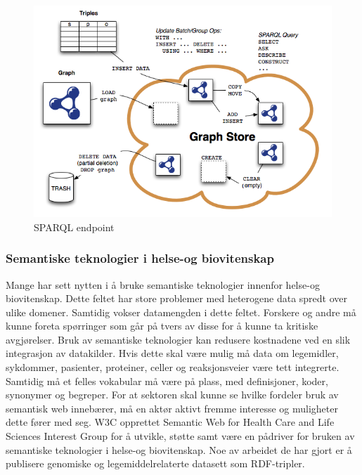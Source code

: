 \begin{figure}[H]
\centering
\includegraphics[width=140mm]{images/sparql_endpoint.png}
\caption{SPARQL endpoint }
\end{figure}

\subsubsection{Semantiske teknologier i helse-og biovitenskap}
Mange har sett nytten i å bruke semantiske teknologier innenfor helse-og biovitenskap. Dette feltet har store problemer med heterogene data spredt over ulike domener. Samtidig vokser datamengden i dette feltet. Forskere og andre må kunne foreta spørringer som går på tvers av disse for å kunne ta kritiske avgjørelser. Bruk av semantiske teknologier kan redusere kostnadene ved en slik integrasjon av datakilder. Hvis dette skal være mulig må data om legemidler, sykdommer, pasienter, proteiner, celler og reaksjonsveier være tett integrerte. Samtidig må et felles vokabular må være på plass, med definisjoner, koder, synonymer og begreper. For at sektoren skal kunne se hvilke fordeler bruk av semantisk web innebærer, må en aktør aktivt fremme interesse og muligheter dette fører med seg. W3C opprettet Semantic Web for Health Care and Life Sciences Interest Group for å utvikle, støtte samt være en pådriver for bruken av semantiske teknologier i helse-og biovitenskap\citep{W3C_HCLSIG}. Noe av arbeidet de har gjort er å publisere genomiske og legemiddelrelaterte datasett som RDF-tripler. 

